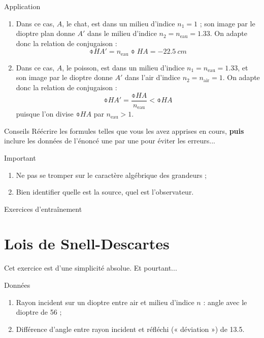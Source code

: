 \documentclass[10pt,a5paper,notitlepage]{book}
\begin{document}
\begin{NCexem}{Application}
    \begin{enumerate}
        \item Dans ce cas, $A$, le chat, est dans un milieu d'indice $n_1 = 1$ ;
            son image par le dioptre plan donne $A'$ dans le milieu d'indice
            $n_2 = n _\mathrm{eau} = 1.33$. On adapte donc la relation de conjugaison
            :
        \[ \obar{HA'} = n _\mathrm{eau}\obar{HA} = \SI{-22.5}{cm}\]
        \item Dans ce cas, $A$, le poisson, est dans un milieu d'indice $n_1 = n
            _\mathrm{eau} = 1.33$, et son image par le dioptre donne $A'$ dans l'air
            d'indice $n_2 = n _\mathrm{air} = 1$. On adapte donc la relation de
            conjugaison :
            \[ \obar{HA'} = \frac{\obar{HA}}{n _\mathrm{eau}} < \obar{HA} \]
            puisque l'on divise $\obar{HA}$ par $n _\mathrm{eau} > 1$.
    \end{enumerate}
\end{NCexem}

\begin{NCcoro}{Conseils}
    Réécrire les formules telles que vous les avez apprises en cours,
    \textbf{puis} inclure les données de l'énoncé une par une pour éviter les
    erreurs...
\end{NCcoro}

\begin{NCimpo}{Important}
    \begin{enumerate}
        \item Ne pas se tromper sur le caractère {\huge algébrique} des
            grandeurs ;
        \item Bien identifier quelle est la source, quel est l'observateur.
    \end{enumerate}
\end{NCimpo}

\begin{center}
    \Huge Exercices d'entraînement
\end{center}

\setcounter{section}{5}
\section{Lois de Snell-Descartes}
Cet exercice est d'une simplicité absolue. Et pourtant...
\begin{NCdefi}{Données}
    \begin{enumerate}
        \item Rayon incident sur un dioptre entre air et milieu d'indice $n$ :
            angle {\huge avec le dioptre} de \SI{56}{\degres} ;
        \item Différence d'angle entre rayon incident et réfléchi (« déviation
            ») de \SI{13.5}{\degres}.
    \end{enumerate}
\end{NCdefi}
\end{document}
